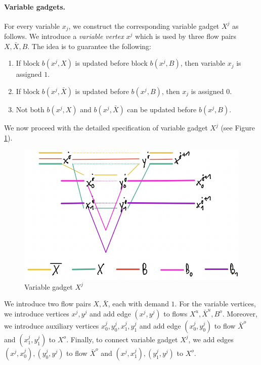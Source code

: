 \documentclass[fontsize=11pt,paper=a4]{book}
\begin{document}
\paragraph{Variable gadgets.}
For every variable \(x_j\), we construct the corresponding variable gadget \(X^j\) as follows.
We introduce a \emph{variable vertex} \(x^j\) which is used by three flow pairs \(X,\bar{X},B\). The idea is to guarantee the following:

\begin{enumerate}
\item If block \(b(x^j,X)\) is updated before block \(b(x^j,B)\), then variable \(x_j\) is assigned \(1\).
\item If block \(b(x^j,\bar{X})\) is updated before \(b(x^j,B)\), then \(x_j\) is assigned \(0\).
\item Not both \(b(x^j,X)\) and \(b(x^j,\bar{X})\) can be updated before \(b(x^j,B)\).
\end{enumerate}

We now proceed with the detailed specification of variable gadget \(X^j\) (see Figure \ref{fig:orgba575d1}).

\begin{figure}[htbp]
\centering
\includegraphics[width=.9\linewidth]{../assets/Screen Shot 2023-02-14 at 15.06.35.png}
\caption{\label{fig:orgba575d1}Variable gadget \(X^j\)}
\end{figure}

We introduce two flow pairs \(X,\bar{X}\), each with demand \(1\).
For the variable vertices, we introduce vertices \(x^j,y^j\) and add edge \((x^j,y^j)\) to flows \(X^u,\bar{X}^u,B^o\).
Moreover, we introduce auxiliary vertices \(x_0^j,y_0^j,x_1^j,y_1^j\) and add edge \((x_0^j,y_0^j)\) to flow \(\bar{X}^o\) and \((x_1^j,y_1^j)\) to \(X^o\).
Finally, to connect variable gadget \(X^j\), we add edges \((x^j,x_0^j),(y_0^j,y^j)\) to flow \(\bar{X}^o\) and \((x^j,x_1^j),(y_1^j,y^j)\) to \(X^o\).
\end{document}
